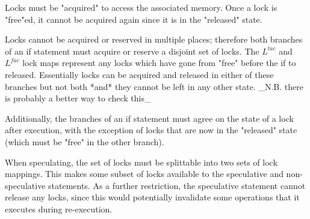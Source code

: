 \documentclass{article}
\begin{document}
Locks must be "acquired" to access the associated memory. Once a lock
is "free"ed, it cannot be acquired again since it is in the "released" state.

Locks cannot be acquired or reserved in multiple places; therefore both
branches of an if statement must acquire or reserve a disjoint set of locks.
The $L^{tac}$ and $L^{fac}$ lock maps represent any locks which have gone from
"free" before the if to released. Essentially locks can be acquired and released in
either of these branches but not both *and* they cannot be left in any other state.
_N.B. there is probably a better way to check this_

Additionally, the branches of an if statement must agree on the state of a lock
after execution, with the exception of locks that are now in the "released" state
(which must be "free" in the other branch).

When speculating, the set of locks must be splittable into two sets of lock mappings.
This makes some subset of locks available to the speculative and non-speculative statements.
As a further restriction, the speculative statement cannot release any locks, since this would
potentially invalidate some operations that it executes during re-execution.
\end{document}
